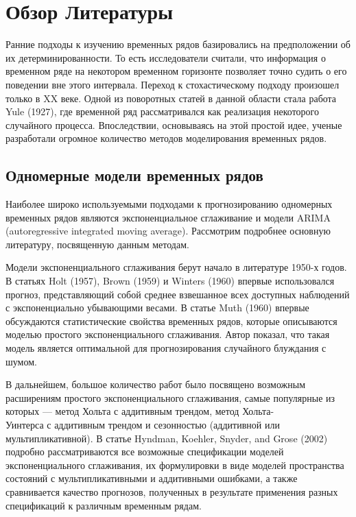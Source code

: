 \section{Обзор Литературы}
Ранние подходы к изучению временных рядов базировались на предположении об их детерминированности. То есть исследователи считали, что информация о временном ряде на некотором временном горизонте позволяет точно судить о его поведении вне этого интервала. Переход к стохастическому подходу произошел только в \textsc{XX} веке. Одной из поворотных статей в данной области стала работа Yule (1927), где временной ряд рассматривался как реализация некоторого случайного процесса. Впоследствии, основываясь на этой простой идее, ученые разработали огромное количество методов моделирования временных рядов.

\subsection{Одномерные модели временных рядов}
Наиболее широко используемыми подходами к прогнозированию одномерных временных рядов являются экспоненциальное сглаживание и модели ARIMA (autoregressive integrated moving average). Рассмотрим подробнее основную литературу, посвященную данным методам.

Модели экспоненциального сглаживания берут начало в литературе 1950-х годов. В статьях Holt (1957), Brown (1959) и Winters (1960) впервые использовался прогноз, представляющий собой среднее взвешанное всех доступных наблюдений с экспоненциально убывающими весами. В статье Muth (1960) впервые обсуждаются статистические свойства временных рядов, которые описываются моделью простого экспоненциального сглаживания. Автор показал, что такая модель является оптимальной для прогнозирования случайного блуждания с шумом.

В дальнейшем, большое количество работ было посвящено возможным расширениям простого экспоненциального сглаживания, самые популярные из которых --- метод Хольта с аддитивным трендом, метод Хольта-\\Уинтерса с аддитивным трендом и сезонностью (аддитивной или мультипликативной). В статье Hyndman, Koehler, Snyder, and Grose (2002) подробно рассматриваются все возможные спецификации моделей экспоненциального сглаживания, их формулировки в виде моделей пространства состояний с мультипликативными и аддитивными ошибками, а также сравнивается качество прогнозов, полученных в результате применения разных спецификаций к различным временным рядам.

